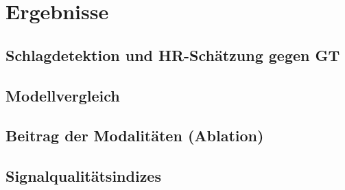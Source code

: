\chapter{Ergebnisse}
\section{Schlagdetektion und HR-Schätzung gegen GT}
\section{Modellvergleich}
\section{Beitrag der Modalitäten (Ablation)}
\section{Signalqualitätsindizes}